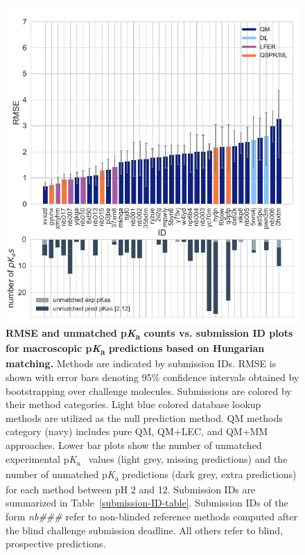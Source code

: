 \documentclass[9pt,lineno,final]{elife}
\newcommand{\pKa}{p\textit{K}\textsubscript{a}}
\begin{document}
\begin{figure}[h]
\centering
\includegraphics[width=0.5\linewidth]{figures/typeIII-rmse-unmatched-pKa-fig.pdf}
\caption{{\bf RMSE and unmatched \pKa{} counts vs. submission ID plots for macroscopic \pKa{} predictions based on Hungarian matching.} 
Methods are indicated by submission IDs. 
RMSE is shown with error bars denoting 95\% confidence intervals obtained by bootstrapping over challenge molecules. 
Submissions are colored by their method categories. Light blue colored database lookup methods are utilized as the null prediction method.
QM methods category (navy) includes pure QM, QM+LEC, and QM+MM approaches.
Lower bar plots show the number of unmatched experimental \pKa{}~ values (light grey, missing predictions) and the number of unmatched \pKa{} predictions (dark grey, extra predictions) for each method between pH 2 and 12. Submission IDs are summarized in Table~\ref{submission-ID-table}. Submission IDs of the form \textit{nb\#\#\#} refer to non-blinded reference methods computed after the blind challenge submission deadline. All others refer to blind, prospective predictions. 
}
\label{fig:typeIII-rmse-plot}
\end{figure}
\end{document}
